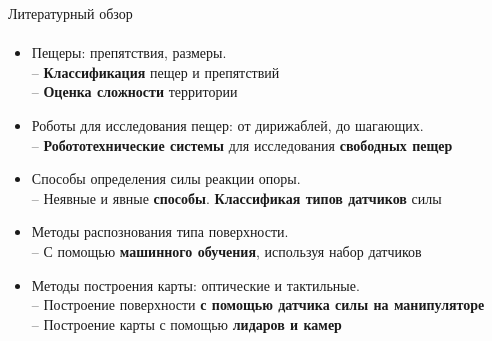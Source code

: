 \documentclass[aspectratio=169,xcolor=table]{beamer}
\begin{document}
\begin{frame}[t]{Литературный обзор}
    \framesubtitle{}
    \vspace{-0.65cm}
    \begin{itemize}
        \item Пещеры: препятствия, размеры. \\ \alert{-- \textbf{Классификация} пещер и препятствий \\ -- \textbf{Оценка сложности} территории}
        \item Роботы для исследования пещер: от дирижаблей, до шагающих. \\ \alert{-- \textbf{Робототехнические системы} для исследования \textbf{свободных пещер}}
        \item Способы определения силы реакции опоры. \\ \alert{-- Неявные и явные \textbf{способы}. \textbf{Классификая типов датчиков} силы}
        \item Методы распознования типа поверхности. \\ \alert{-- С помощью \textbf{машинного обучения}, используя набор датчиков}
        \item Методы построения карты: оптические и тактильные. \\ \alert{-- Построение поверхности \textbf{с помощью датчика силы на манипуляторе} \\ -- Построение карты с помощью \textbf{лидаров и камер}}
    \end{itemize}

\end{frame}
\end{document}
